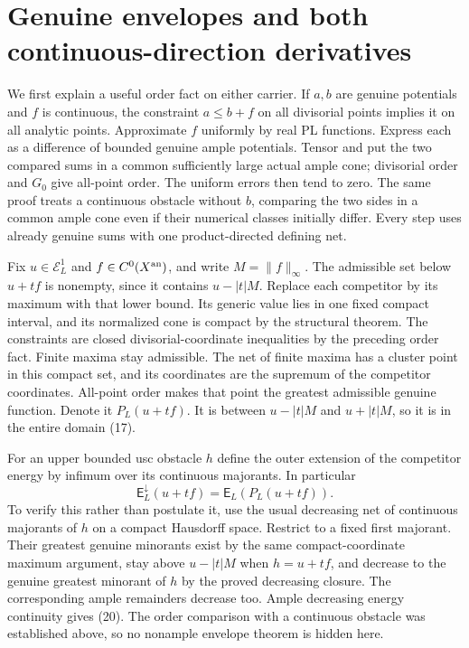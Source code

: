\documentclass[11pt]{article}
\begin{document}
\section{Genuine envelopes and both continuous-direction derivatives}
We first explain a useful order fact on either carrier. If $a,b$
are genuine potentials and $f$ is continuous, the constraint
$a\leq b+f$ on all divisorial points implies it on all analytic
points. Approximate $f$ uniformly by real PL functions. Express
each as a difference of bounded genuine ample potentials. Tensor
and put the two compared sums in a common sufficiently large
actual ample cone; divisorial order and $G_0$ give all-point order.
The uniform errors then tend to zero. The same proof treats a
continuous obstacle without $b$, comparing the two sides in a
common ample cone even if their numerical classes initially differ.
Every step uses already genuine sums with one product-directed
defining net.

Fix $u\in\mathcal E_L^1$ and $f\in C^0(X^{\rm an})$, and write
$M=\|f\|_\infty$. The admissible set below $u+tf$ is nonempty,
since it contains $u-|t|M$. Replace each competitor by its maximum
with that lower bound. Its generic value lies in one fixed compact
interval, and its normalized cone is compact by the structural
theorem. The constraints are closed divisorial-coordinate
inequalities by the preceding order fact. Finite maxima stay
admissible. The net of finite maxima has a cluster point in this
compact set, and its coordinates are the supremum of the
competitor coordinates. All-point order makes that point the
greatest admissible genuine function. Denote it
$P_L(u+tf)$. It is between $u-|t|M$ and $u+|t|M$, so it is
in the entire domain (17).

For an upper bounded usc obstacle $h$ define the outer extension
of the competitor energy by infimum over its continuous majorants.
In particular
\[
 \mathsf E_L^\downarrow(u+tf)=\mathsf E_L(P_L(u+tf)).       \tag{20}
\]
To verify this rather than postulate it, use the usual decreasing
net of continuous majorants of $h$ on a compact Hausdorff space.
Restrict to a fixed first majorant. Their greatest genuine minorants
exist by the same compact-coordinate maximum argument, stay above
$u-|t|M$ when $h=u+tf$, and decrease to the genuine greatest
minorant of $h$ by the proved decreasing closure. The corresponding
ample remainders decrease too. Ample decreasing energy continuity
gives (20). The order comparison with a continuous obstacle was
established above, so no nonample envelope theorem is hidden here.
\end{document}
